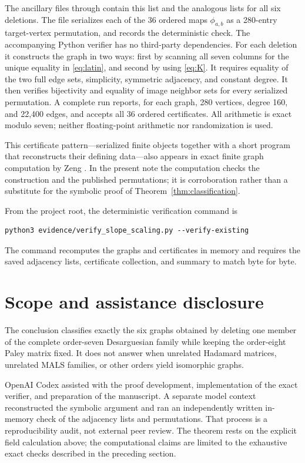 \documentclass[11pt]{article}
\begin{document}
The ancillary files  through
 contain this list and the analogous lists for all six
deletions.  The file
 serializes each of the
36 ordered maps $\phi_{a,b}$ as a 280-entry target-vertex permutation, and
 records the deterministic check.
The accompanying Python verifier has no third-party dependencies.  For each deletion it
constructs the graph in two ways: first by scanning all seven columns for the
unique equality in \eqref{eq:latin}, and second by using \eqref{eq:K}.  It
requires equality of the two full edge sets, simplicity, symmetric adjacency,
and constant degree.  It then verifies bijectivity and equality of image
neighbor sets for every serialized permutation.  A complete run reports, for
each graph, 280 vertices, degree 160, and 22,400 edges, and accepts all 36
ordered certificates.  All arithmetic is exact modulo seven; neither
floating-point arithmetic nor randomization is used.

This certificate pattern---serialized finite objects together with a short
program that reconstructs their defining data---also appears in exact finite
graph computation by Zeng \cite{Zeng2026SSRN7385138}.  In the present note the
computation checks the construction and the published permutations; it is
corroboration rather than a substitute for the symbolic proof of
Theorem~\ref{thm:classification}.

From the project root, the deterministic verification command is
\begin{verbatim}
python3 evidence/verify_slope_scaling.py --verify-existing
\end{verbatim}
The command recomputes the graphs and certificates in memory and requires the
saved adjacency lists, certificate collection, and summary to match byte for
byte.

\section{Scope and assistance disclosure}

The conclusion classifies exactly the six graphs obtained by deleting one
member of the complete order-seven Desarguesian family while keeping the
order-eight Paley matrix fixed.  It does not answer when unrelated Hadamard
matrices, unrelated MALS families, or other orders yield isomorphic graphs.

OpenAI Codex assisted with the proof development, implementation of the exact
verifier, and preparation of the manuscript.  A separate model context
reconstructed the symbolic argument and ran an independently written
in-memory check of the adjacency lists and permutations.  That process is a
reproducibility audit, not external peer review.  The theorem rests on the
explicit field calculation above; the computational claims are limited to
the exhaustive exact checks described in the preceding section.

\enlargethispage{2\baselineskip}


\end{document}
